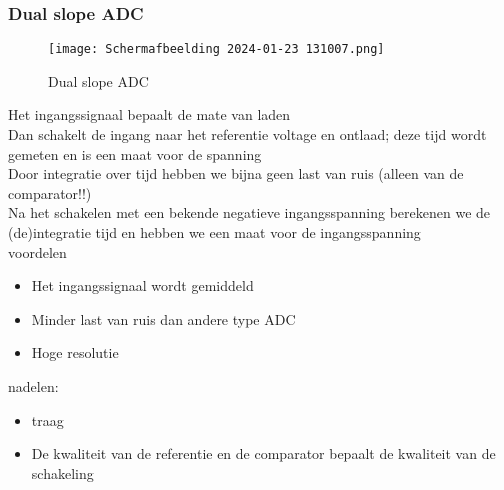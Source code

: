 \subsubsection{Dual slope ADC}
\begin{figure}[H]
    \centering
    \texttt{[image: Schermafbeelding 2024-01-23 131007.png]}
    \caption*{Dual slope ADC}
    \end{figure}
Het ingangssignaal bepaalt de mate van laden\\
Dan schakelt de ingang naar het referentie voltage en ontlaad; deze tijd wordt gemeten en is een maat voor de spanning\\
Door integratie over tijd hebben we bijna geen last van ruis (alleen van de comparator!!)\\
Na het schakelen met een bekende negatieve ingangsspanning berekenen we de (de)integratie tijd en hebben we een maat voor de ingangsspanning\\
voordelen
\begin{itemize}
    \item Het ingangssignaal wordt gemiddeld
    \item Minder last van ruis dan andere type ADC
    \item Hoge resolutie
\end{itemize}
nadelen:
\begin{itemize}
    \item traag
    \item De kwaliteit van de referentie en de comparator bepaalt de kwaliteit van de schakeling
\end{itemize}

